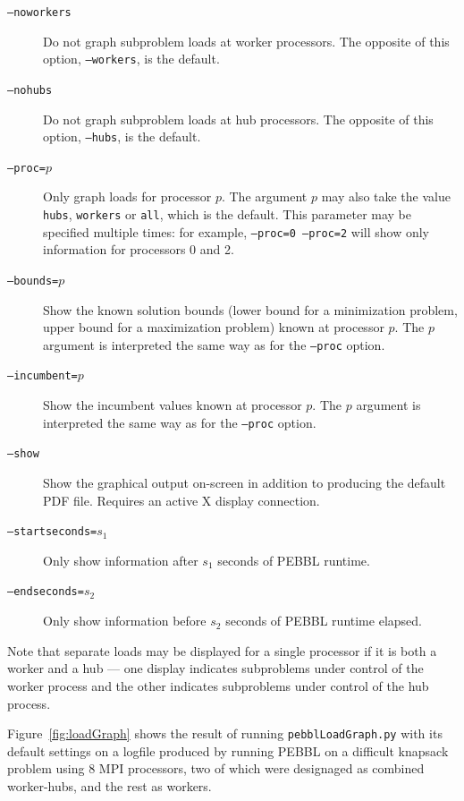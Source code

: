 \begin{description}
\item[\texttt{--noworkers}] Do not graph subproblem loads at worker
  processors.  The opposite of this option, \texttt{--workers}, is the
  default.
\item[\texttt{--nohubs}] Do not graph subproblem loads at hub
  processors.  The opposite of this option, \texttt{--hubs}, is the
  default.
\item[\texttt{--proc=}$p$]  Only graph loads for processor $p$.  The
  argument $p$ may also take the value \texttt{hubs}, \texttt{workers}
  or \texttt{all}, which is the default.  This parameter may be
  specified multiple times: for example, \texttt{--proc=0 --proc=2}
  will show only information for processors 0 and 2.
\item[\texttt{--bounds=}$p$] Show the known solution bounds (lower
  bound for a minimization problem, upper bound for a maximization
  problem) known at processor $p$.  The $p$ argument is interpreted
  the same way as for the \texttt{--proc} option.
\item[\texttt{--incumbent=}$p$] Show the incumbent values known at
  processor $p$.  The $p$ argument is interpreted the same way as for
  the \texttt{--proc} option.
\item[\texttt{--show}] Show the graphical output on-screen in addition
  to producing the default PDF file.  Requires an active X display
  connection.
\item[\texttt{--startseconds=}$s_1$]  Only show information after
  $s_1$ seconds of PEBBL runtime.
\item[\texttt{--endseconds=}$s_2$]  Only show information before
  $s_2$ seconds of PEBBL runtime elapsed.
\end{description}
Note that separate loads may be displayed for a single processor if it
is both a worker and a hub --- one display indicates subproblems under
control of the worker process and the other indicates subproblems
under control of the hub process.

Figure~\ref{fig:loadGraph} shows the result of running
\texttt{pebblLoadGraph.py} with its default settings on a logfile
produced by running PEBBL on a difficult knapsack problem using 8 MPI
processors, two of which were designaged as combined worker-hubs, and
the rest as workers.

